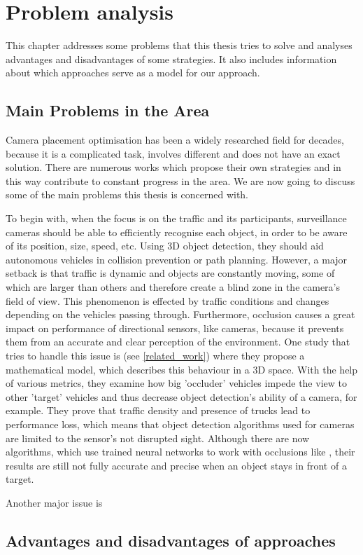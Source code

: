 \chapter{Problem analysis} \label{problem_analysis}
This chapter addresses some problems that this thesis tries to solve and analyses advantages and disadvantages of some strategies. It also includes information about which approaches serve as a model for our approach.

\section{Main Problems in the Area}
Camera placement optimisation has been a widely researched field for decades, because it is a complicated task, involves different and does not have an exact solution. There are numerous works which propose their own strategies and in this way contribute to constant progress in the area. We are now going to discuss some of the main problems this thesis is concerned with.

To begin with, when the focus is on the traffic and its participants, surveillance cameras should be able to efficiently recognise each object, in order to be aware of its position, size, speed, etc. Using 3D object detection, they should aid autonomous vehicles in collision prevention or path planning. However, a major setback is that traffic is dynamic and objects are constantly moving, some of which are larger than others and therefore create a blind zone in the camera's field of view. This phenomenon is effected by traffic conditions and changes depending on the vehicles passing through. Furthermore, occlusion causes a great impact on performance of directional sensors, like cameras, because it prevents them from an accurate and clear perception of the environment. One study that tries to handle this issue is \cite{occlusion_degree_model} (see \ref{related_work}) where they propose a mathematical model, which describes this behaviour in a 3D space. With the help of various metrics, they examine how big 'occluder' vehicles impede the view to other 'target' vehicles and thus decrease object detection's ability of a camera, for example. They prove that traffic density and presence of trucks lead to performance loss, which means that object detection algorithms used for cameras are limited to the sensor's not disrupted sight. Although there are now algorithms, which use trained neural networks to work with occlusions like \cite{object_detection_alg}, their results are still not fully accurate and precise when an object stays in front of a target.

Another major issue is 

\section{Advantages and disadvantages of approaches}

